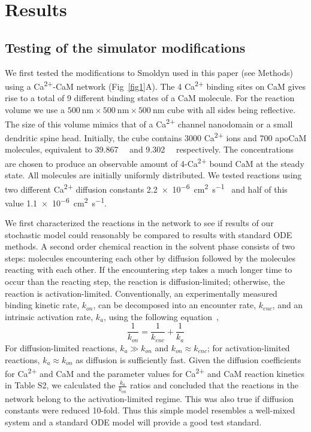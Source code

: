 \documentclass[10pt,letterpaper]{article}
\begin{document}
\section*{Results}
\subsection*{Testing of the simulator modifications}
We first tested the modifications to Smoldyn used in this paper (see Methods) using a Ca\textsuperscript{2+}-CaM network (Fig~\ref{fig1}A). The 4 Ca\textsuperscript{2+} binding sites on CaM gives rise to a total of 9 different binding states of a CaM molecule. For the reaction volume we use a $\SI{500}{\nm}\times\SI{500}{\nm}\times\SI{500}{\nm}$ cube with all sides being reflective. The size of this volume mimics that of a Ca\textsuperscript{2+} channel nanodomain or a small dendritic spine head. Initially, the cube contains 3000 Ca\textsuperscript{2+} ions and 700 apoCaM molecules, equivalent to \SI{39.867}{\micro\Molar} and \SI{9.302}{\micro\Molar} respectively. The concentrations are chosen to produce an observable amount of 4-Ca\textsuperscript{2+} bound CaM at the steady state. All molecules are initially uniformly distributed. We tested reactions using two different Ca\textsuperscript{2+} diffusion constants \SI{2.2e-6}{\square\cm\per\s}~\cite{Keller:2008ez} and half of this value \SI{1.1e-6}{\square\cm\per\s}.

We first characterized the reactions in the network to see if results of our stochastic model could reasonably be compared to results with standard ODE methods. A second order chemical reaction in the solvent phase consists of two steps: molecules encountering each other by diffusion followed by the molecules reacting with each other. If the encountering step takes a much longer time to occur than the reacting step, the reaction is diffusion-limited; otherwise, the reaction is activation-limited. Conventionally, an experimentally measured binding kinetic rate, $k_{on}$, can be decomposed into an encounter rate, $k_{enc}$, and an intrinsic activation rate, $k_{a}$, using the following equation~\cite{Rice:198505},
\begin{equation}\frac{1}{k_{on}}=\frac{1}{k_{enc}}+\frac{1}{k_a}\end{equation}
For diffusion-limited reactions, $k_a \gg k_{on}$ and $k_{on} \approx k_{enc}$; for activation-limited reactions, $k_a \approx k_{on}$ as diffusion is sufficiently fast. Given the diffusion coefficients for Ca\textsuperscript{2+} and CaM and the parameter values for Ca\textsuperscript{2+} and CaM reaction kinetics in Table S2, we calculated the $\frac{k_a}{k_{on}}$ ratios and concluded that the reactions in the network belong to the activation-limited regime. This was also true if diffusion constants were reduced 10-fold. Thus this simple model resembles a well-mixed system and a standard ODE model will provide a good test standard. 
\end{document}
